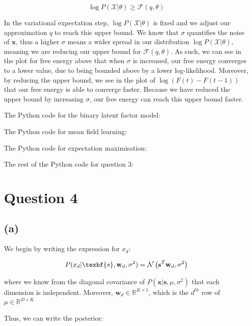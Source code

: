 \documentclass[12pt]{article}
\begin{document}
\[\log P(\mathcal{X} | \theta) \geq \mathcal{F}(q, \theta)\]

In the variational expectation step, $\log P(\mathcal{X} | \theta)$ is fixed and we adjust our approximation $q$ to reach this upper bound. We know that $\sigma$ quantifies the noise of $\textbf{x}$, thus a higher $\sigma$ means a wider spread in our distribution $\log P(\mathcal{X} | \theta)$, meaning we are reducing our upper bound for $\mathcal{F}(q, \theta)$. As such, we can see in the plot for free energy above that when $\sigma$ is increased, our free energy converges to a lower value, due to being bounded above by a lower log-likelihood. Moreover, by reducing the upper bound, we see in the plot of $\log(F(t)-F(t-1))$ that our free energy is able to converge faster. Because we have reduced the upper bound by increasing $\sigma$, our free energy can reach this upper bound faster.

\newpage
The Python code for the binary latent factor model:


\newpage
The Python code for mean field learning:


\newpage
The Python code for expectation maximisation:



\newpage
The rest of the Python code for question 3:

\newpage
\section*{Question 4}
\subsection*{(a)}

We begin by writing the expression for $x_d$:

\[P(x_d | \texbf{s}, \textbf{w}_d, \sigma^2) = \mathcal{N}\left(\textbf{s}^T\textbf{w}_d, \sigma^2\right)\]

where we know from the diagonal covariance of $P(\textbf{x} | \textbf{s}, \mu, \sigma^2)$ that each dimension is independent. Moreover, $\textbf{w}_d \in \mathbb{R}^{K\times 1}$, which is the $d^{th}$ row of $\mu \in \mathbb{R}^{D \times K}$

Thus, we can write the posterior:
\end{document}
